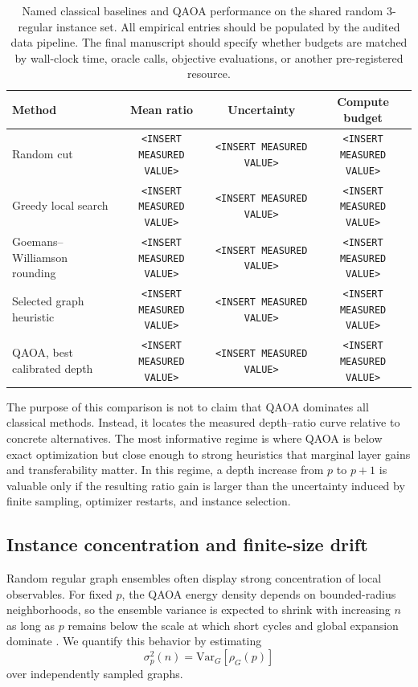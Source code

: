 \documentclass[reprint,aps,longbibliography]{revtex4-2}
\newcommand{\Var}{\mathrm{Var}}
\begin{document}
\begin{table}[t]
\centering
\begin{tabular}{lccc}
\toprule
Method & Mean ratio & Uncertainty & Compute budget \\
\midrule
Random cut & \texttt{<INSERT MEASURED VALUE>} & \texttt{<INSERT MEASURED VALUE>} & \texttt{<INSERT MEASURED VALUE>} \\
Greedy local search & \texttt{<INSERT MEASURED VALUE>} & \texttt{<INSERT MEASURED VALUE>} & \texttt{<INSERT MEASURED VALUE>} \\
Goemans--Williamson rounding & \texttt{<INSERT MEASURED VALUE>} & \texttt{<INSERT MEASURED VALUE>} & \texttt{<INSERT MEASURED VALUE>} \\
Selected graph heuristic & \texttt{<INSERT MEASURED VALUE>} & \texttt{<INSERT MEASURED VALUE>} & \texttt{<INSERT MEASURED VALUE>} \\
QAOA, best calibrated depth & \texttt{<INSERT MEASURED VALUE>} & \texttt{<INSERT MEASURED VALUE>} & \texttt{<INSERT MEASURED VALUE>} \\
\bottomrule
\end{tabular}
\caption{Named classical baselines and QAOA performance on the shared random 3-regular instance set. All empirical entries should be populated by the audited data pipeline. The final manuscript should specify whether budgets are matched by wall-clock time, oracle calls, objective evaluations, or another pre-registered resource.}
\label{tab:baselines}
\end{table}

The purpose of this comparison is not to claim that QAOA dominates all classical methods. Instead, it locates the measured depth--ratio curve relative to concrete alternatives. The most informative regime is where QAOA is below exact optimization but close enough to strong heuristics that marginal layer gains and transferability matter. In this regime, a depth increase from $p$ to $p+1$ is valuable only if the resulting ratio gain is larger than the uncertainty induced by finite sampling, optimizer restarts, and instance selection.

\subsection{Instance concentration and finite-size drift}

Random regular graph ensembles often display strong concentration of local observables. For fixed $p$, the QAOA energy density depends on bounded-radius neighborhoods, so the ensemble variance is expected to shrink with increasing $n$ as long as $p$ remains below the scale at which short cycles and global expansion dominate \cite{Wormald1999RandomRegular,Brandao2022LocalAlgorithms}. We quantify this behavior by estimating
\begin{equation}
  \sigma_p^2(n)=\Var_G[\rho_G(p)]
\end{equation}
over independently sampled graphs.
\end{document}
